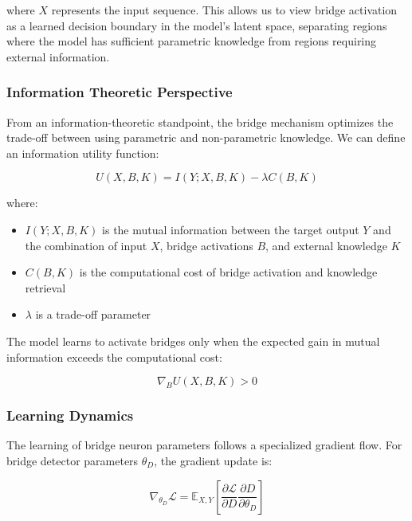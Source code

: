 \documentclass[9pt,a4paper,twocolumn,twoside]{tau-class/tau}
\begin{document}
    where $X$ represents the input sequence. This allows us to view bridge activation as a learned decision boundary in the model's latent space, separating regions where the model has sufficient parametric knowledge from regions requiring external information.

\subsubsection{Information Theoretic Perspective}

    From an information-theoretic standpoint, the bridge mechanism optimizes the trade-off between using parametric and non-parametric knowledge. We can define an information utility function:

    \begin{equation}
        U(X, B, K) = I(Y; X, B, K) - \lambda C(B, K)
    \end{equation}

    where:
    \begin{itemize}
        \item $I(Y; X, B, K)$ is the mutual information between the target output $Y$ and the combination of input $X$, bridge activations $B$, and external knowledge $K$
        \item $C(B, K)$ is the computational cost of bridge activation and knowledge retrieval
        \item $\lambda$ is a trade-off parameter
    \end{itemize}

    The model learns to activate bridges only when the expected gain in mutual information exceeds the computational cost:

    \begin{equation}
        \nabla_B U(X, B, K) > 0
    \end{equation}

\subsubsection{Learning Dynamics}

    The learning of bridge neuron parameters follows a specialized gradient flow. For bridge detector parameters $\theta_D$, the gradient update is:

    \begin{equation}
        \nabla_{\theta_D} \mathcal{L} = \mathbb{E}_{X,Y} \left[ \frac{\partial \mathcal{L}}{\partial D} \frac{\partial D}{\partial \theta_D} \right]
    \end{equation}
\end{document}
